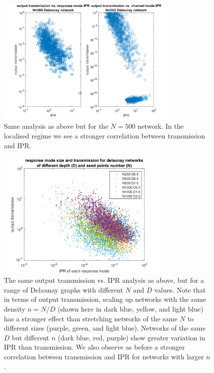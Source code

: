 \begin{figure}[hbp]
  \centering
    \includegraphics[width=0.8\textwidth]{ch3/fig3/IPRvsT_N500dexample.png}
    \caption{Same analysis as above but for the $N=500$ network. In the localised regime we see a stronger correlation between transmission and IPR.} 
    \label{fig:IPRvsT_N500}
\end{figure}

\begin{figure}[htp]
  \centering
    \includegraphics[width=0.75\textwidth]{ch3/fig3/compare_delaunay.png}
    \caption{The same output transmission vs. IPR analysis as above, but for a range of Delaunay graphs with different $N$ and $D$ values. Note that in terms of output transmission, scaling up networks with the same density $n=N/D$ (shown here in dark blue, yellow, and light blue) has a stronger effect than stretching networks of the same $N$ to different sizes (purple, green, and light blue). Networks of the same $D$ but different $n$ (dark blue, red, purple) show greater variation in IPR than transmission. We also observe as before a stronger correlation between transmission and IPR for networks with larger $n$.} 
    \label{fig:compare_delaunay}
\end{figure}

